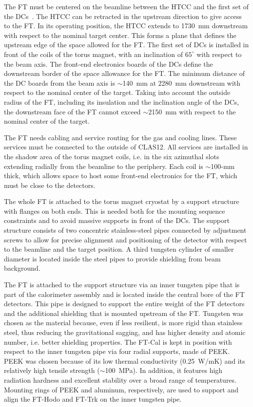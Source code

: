 The FT must be centered on the beamline between the HTCC and the first set of the DCs~\cite{dc}. The HTCC
can be retracted in the upstream direction to give access to the FT. In its operating position, the HTCC extends to
1730~mm downstream with respect to the nominal target center. This forms a plane that defines the upstream edge
of the space allowed for the FT. The first set of DCs is installed in front of the coils of the torus magnet, with an
inclination of $65^\circ$ with respect to the beam axis. The front-end electronics boards of the DCs define the
downstream border of the space allowance for the FT. The minimum distance of the DC boards from the beam axis
is $\sim$140~mm at 2280~mm downstream with respect to the nominal center of the target. Taking into account the
outside radius of the FT, including its insulation and the inclination angle of the DCs, the downstream face of the FT
cannot exceed $\sim$2150~mm with respect to the nominal center of the target.

The FT needs cabling and service routing for the gas and cooling lines. These services must be connected to the
outside of CLAS12. All services are installed in the shadow area of the torus magnet coils, i.e. in the six azimuthal
slots extending radially from the beamline to the periphery. Each coil is $\sim$100-mm thick, which allows space
to host some front-end electronics for the FT, which must be close to the detectors.

The whole FT is attached to the torus magnet cryostat by a support structure with flanges on both ends. This is
needed both for the mounting sequence constraints and to avoid massive supports in front of the DCs. The support
structure consists of two concentric stainless-steel pipes connected by adjustment screws to allow for precise
alignment and positioning of the detector with respect to the beamline and the target position. A third tungsten
cylinder of smaller diameter is located inside the steel pipes to provide shielding from beam background. 

The FT is attached to the support structure via an inner tungsten pipe that is part of the calorimeter assembly
and is located inside the central bore of the FT detectors. This pipe is designed to support the entire weight of the
FT detectors and the additional shielding that is mounted upstream of the FT. Tungsten was chosen as the material
because, even if less resilient, is more rigid than stainless steel, thus reducing the gravitational sagging, and has
higher density and atomic number, i.e. better shielding properties. The FT-Cal is kept in position with respect to the
inner tungsten pipe via four radial supports, made of PEEK. PEEK was chosen because of its low thermal conductivity
(0.25~W/mK) and its relatively high tensile strength ($\sim$100~MPa). In addition, it features high radiation
hardness and excellent stability over a broad range of temperatures. Mounting rings of PEEK and aluminum,
respectively, are used to support and align the FT-Hodo and FT-Trk on the inner tungsten pipe.


